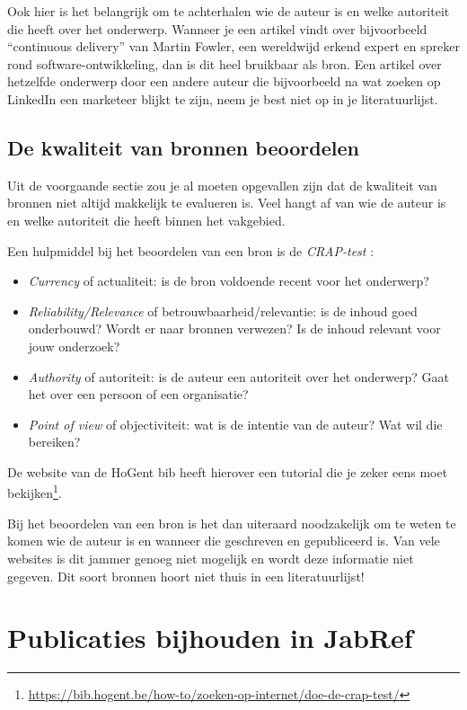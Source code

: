 Ook hier is het belangrijk om te achterhalen wie de auteur is en welke autoriteit die heeft over het onderwerp. Wanneer je een artikel vindt over bijvoorbeeld ``continuous delivery'' van Martin Fowler, een wereldwijd erkend expert en spreker rond software-ontwikkeling, dan is dit heel bruikbaar als bron. Een artikel over hetzelfde onderwerp door een andere auteur die bijvoorbeeld na wat zoeken op LinkedIn een marketeer blijkt te zijn, neem je best niet op in je literatuurlijst.

\subsection{De kwaliteit van bronnen beoordelen}
\label{sub:de-kwaliteit-van-bronnen-beoordelen}

Uit de voorgaande sectie zou je al moeten opgevallen zijn dat de kwaliteit van bronnen niet altijd makkelijk te evalueren is. Veel hangt af van wie de auteur is en welke autoriteit die heeft binnen het vakgebied.

Een hulpmiddel bij het beoordelen van een bron is de \emph{CRAP-test} \autocite{Gratz2015}:

\begin{itemize}
  \item \emph{Currency} of actualiteit: is de bron voldoende recent voor het onderwerp?
  \item \emph{Reliability/Relevance} of betrouwbaarheid/relevantie: is de inhoud goed onderbouwd? Wordt er naar bronnen verwezen? Is de inhoud relevant voor jouw onderzoek?
  \item \emph{Authority} of autoriteit: is de auteur een autoriteit over het onderwerp? Gaat het over een persoon of een organisatie?
  \item \emph{Point of view} of objectiviteit: wat is de intentie van de auteur? Wat wil die bereiken?
\end{itemize}

De website van de HoGent bib heeft hierover een tutorial die je zeker eens moet bekijken\footnote{\url{https://bib.hogent.be/how-to/zoeken-op-internet/doe-de-crap-test/}}.

Bij het beoordelen van een bron is het dan uiteraard noodzakelijk om te weten te komen wie de auteur is en wanneer die geschreven en gepubliceerd is. Van vele websites is dit jammer genoeg niet mogelijk en wordt deze informatie niet gegeven. Dit soort bronnen hoort niet thuis in een literatuurlijst!

\section{Publicaties bijhouden in JabRef}
\label{sec:publicaties_bijhouden_in_jabref}

